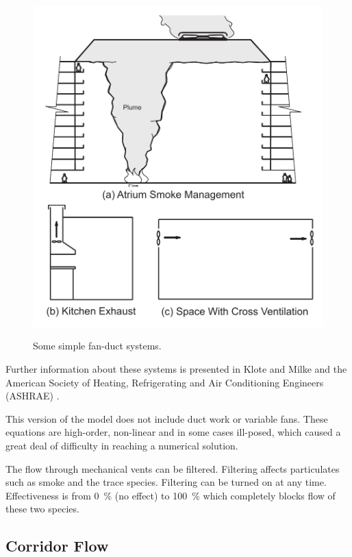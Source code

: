 \begin{figure}
\begin{center}
\includegraphics[width=5.0in]{FIGURES/Theory/HVAC_Fans_and_Ducts}\\
\end{center}
\caption{Some simple fan-duct systems.}
 \label{fig:Fans_and_Ducts}
\end{figure}

Further information about these systems is presented in Klote and Milke \cite{Klote:2002} and the American Society of Heating, Refrigerating and Air Conditioning Engineers (ASHRAE) \cite{ASHRAE:2001}.

This version of the model does not include duct work or variable fans. These equations are high-order, non-linear and in some cases ill-posed, which caused a great deal of difficulty in reaching a numerical solution.

The flow through mechanical vents can be filtered. Filtering affects particulates such as smoke and the trace species. Filtering can be turned on at any time. Effectiveness is from 0~\% (no effect) to 100~\% which completely blocks flow of these two species.

\subsection{Corridor Flow}\label{sec:corridorflow}

